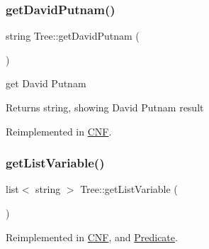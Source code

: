 \subsubsection{\texorpdfstring{get\+David\+Putnam()}{getDavidPutnam()}}
{\footnotesize\ttfamily string Tree\+::get\+David\+Putnam (\begin{DoxyParamCaption}{ }\end{DoxyParamCaption})\hspace{0.3cm}{\ttfamily [virtual]}}



get David Putnam 

\begin{DoxyReturn}{Returns}
string, showing David Putnam result 
\end{DoxyReturn}


Reimplemented in \hyperlink{class_c_n_f_a029535415f1d5cf92c8023693ce7b40e}{C\+NF}.

\mbox{\label{class_tree_a525967d14a17de0ad9c9072b025af1c3}} 
\subsubsection{\texorpdfstring{get\+List\+Variable()}{getListVariable()}}
{\footnotesize\ttfamily list$<$ string $>$ Tree\+::get\+List\+Variable (\begin{DoxyParamCaption}{ }\end{DoxyParamCaption})\hspace{0.3cm}{\ttfamily [virtual]}}



Reimplemented in \hyperlink{class_c_n_f_abb762bfe4bc7bbccda81f8db332bafe3}{C\+NF}, and \hyperlink{class_predicate_ae2524ae4cd1e71a00984f6a49d717469}{Predicate}.


